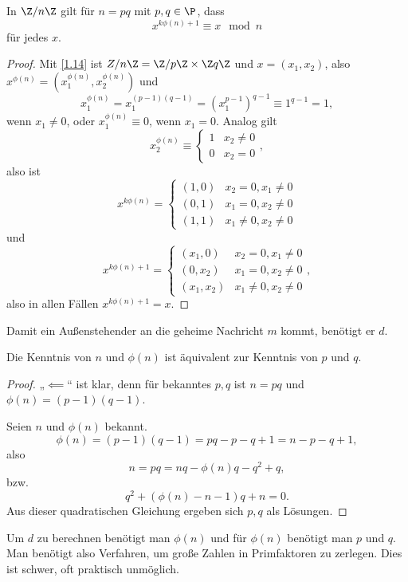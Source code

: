 \setcounter{thm}{1}
\begin{lem} \label{3.2}
	In $\Z / n \Z$ gilt für $n = pq$ mit $p,q \in \P$, dass
	\[
		x^{k\phi(n) + 1} \equiv x \mod n
	\]
	für jedes $x$.
	\begin{proof}
		Mit \ref{1.14} ist $Z / n\Z = \Z /p\Z \times \Z q\Z$ und $x = (x_1, x_2)$, also $x^{\phi(n)} = (x_1^{\phi(n)}, x_2^{\phi(n)})$ und
		\[
			x_1^{\phi(n)}
			= x_1^{(p-1)(q-1)}
			= (x_1^{p-1})^{q-1}
			\equiv 1^{q-1}
			= 1,
		\]
		wenn $x_1 \neq 0$, oder $x_1^{\phi(n)} \equiv 0$, wenn $x_1 = 0$.
		Analog gilt
		\[
			x_2^{\phi(n)} \equiv \begin{cases}
				1 & x_2 \neq 0 \\
				0 & x_2 = 0
			\end{cases},
		\]
		also ist
		\[
			x^{k\phi(n)} = \begin{cases}
				(1, 0) & x_2=0, x_1 \neq 0 \\
				(0,1) & x_1=0, x_2 \neq 0 \\
				(1,1) & x_1\neq 0, x_2 \neq 0
			\end{cases}
		\]
		und
		\[
			x^{k\phi(n) + 1} = \begin{cases}
				(x_1, 0) & x_2=0, x_1 \neq 0 \\
				(0,x_2) & x_1=0, x_2 \neq 0 \\
				(x_1,x_2) & x_1\neq 0, x_2 \neq 0
			\end{cases},
		\]
		also in allen Fällen $x^{k\phi(n) + 1} = x$.
	\end{proof}
\end{lem}

Damit ein Außenstehender an die geheime Nachricht $m$ kommt, benötigt er $d$.

\begin{lem} \label{3.3}
	Die Kenntnis von $n$ und $\phi(n)$ ist äquivalent zur Kenntnis von $p$ und $q$.
	\begin{proof}
		„$\impliedby$“ ist klar, denn für bekanntes $p, q$ ist $n = pq$ und $\phi(n) = (p-1)(q-1)$.

		Seien $n$ und $\phi(n)$ bekannt.
		\[
			\phi(n)
			= (p-1)(q-1)
			= pq - p - q + 1
			= n - p - q + 1,
		\]
		also
		\[
			n = pq = nq - \phi(n)q - q^2 + q,
		\]
		bzw.
		\[
			q^2 + (\phi(n) - n - 1)q + n = 0.
		\]
		Aus dieser quadratischen Gleichung ergeben sich $p, q$ als Lösungen.
	\end{proof}
\end{lem}

Um $d$ zu berechnen benötigt man $\phi(n)$ und für $\phi(n)$ benötigt man $p$ und $q$.
Man benötigt also Verfahren, um große Zahlen in Primfaktoren zu zerlegen.
Dies ist schwer, oft praktisch unmöglich.


